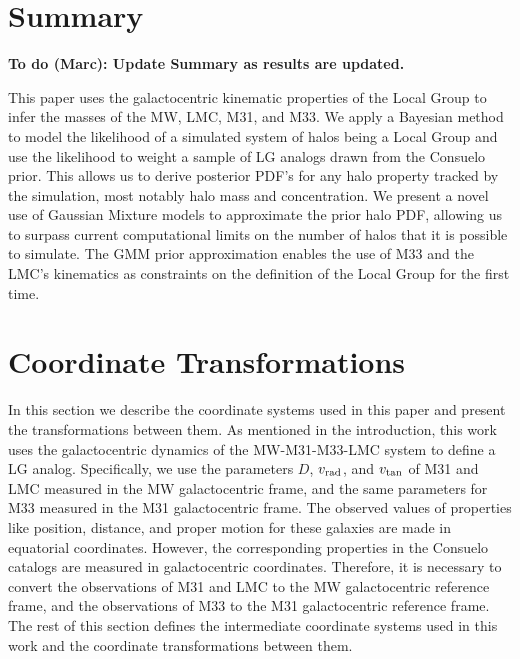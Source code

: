 \documentclass[iop,apj,twocolappendix,numberedappendix]{emulateapj}
\def\distance{D}
\def\vrad{v_{\rm rad}}
\def\vtan{v_{\rm tan}}
\newcommand{\consuelo}{{\sc Consuelo }}
\newcommand{\todo}[2]{{\bf To do (#1): #2}}
\begin{document}
\section{Summary}
\label{sec:conclude}
\todo{Marc}{Update Summary as results are updated.}
\par
This paper uses the galactocentric kinematic properties of the Local Group to infer the masses of the MW, LMC, M31, and M33. 
We apply a Bayesian method to model the likelihood of a simulated system of halos being a Local Group and use the likelihood to weight a sample of LG analogs drawn from the \consuelo prior. 
This allows us to derive posterior PDF's for any halo property tracked by the simulation, most notably halo mass and concentration. 
We present a novel use of Gaussian Mixture models to approximate the prior halo PDF, allowing us to surpass current computational limits on the number of halos that it is possible to simulate.
The GMM prior approximation enables the use of M33 and the LMC's kinematics as constraints on the definition of the Local Group for the first time.



\clearpage


\appendix
\section{Coordinate Transformations}
\label{sec:coord}
In this section we describe the coordinate systems used in this paper and present the transformations between them.  As mentioned in the introduction, this work uses the galactocentric dynamics of the MW-M31-M33-LMC system to define a LG analog. Specifically, we use the parameters $\distance$, $\vrad$, and $\vtan$ of M31 and LMC measured in the MW galactocentric frame, and the same parameters for M33 measured in the M31 galactocentric frame. 
The observed values of properties like position, distance, and proper motion for these galaxies are made in equatorial coordinates.  However, the corresponding properties in the \consuelo catalogs are measured in galactocentric coordinates.  Therefore, it is necessary to convert the observations of M31 and LMC to the MW galactocentric reference frame, and the observations of M33 to the M31 galactocentric reference frame.  The rest of this section defines the intermediate coordinate systems used in this work and the coordinate transformations between them.
\end{document}
